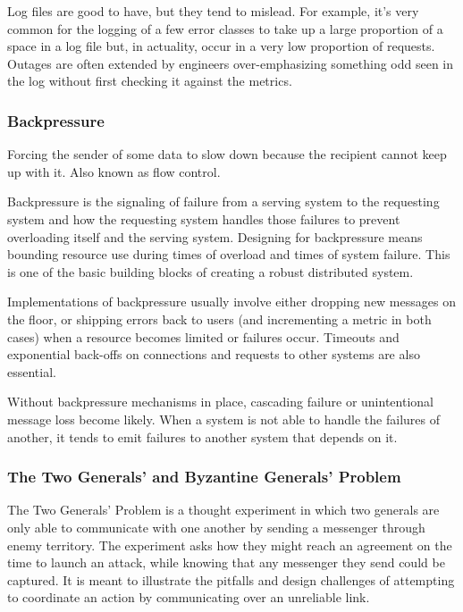 \documentclass{article}
\begin{document}
    Log files are good to have, but they tend to mislead. For example, it’s very common for the logging of a few error classes to take up a large proportion of a space in a log file but, in actuality, occur in a very low proportion of requests. Outages are often extended by engineers over-emphasizing something odd seen in the log without first checking it against the metrics.
    
    
    \subsubsection{Backpressure}
    Forcing the sender of some data to slow down because the recipient cannot keep up with it. Also known as flow control.
    
    Backpressure is the signaling of failure from a serving system to the requesting system and how the requesting system handles those failures to prevent overloading itself and the serving system. Designing for backpressure means bounding resource use during times of overload and times of system failure. This is one of the basic building blocks of creating a robust distributed system.
    
    Implementations of backpressure usually involve either dropping new messages on the floor, or shipping errors back to users (and incrementing a metric in both cases) when a resource becomes limited or failures occur. Timeouts and exponential back-offs on connections and requests to other systems are also essential.

    Without backpressure mechanisms in place, cascading failure or unintentional message loss become likely. When a system is not able to handle the failures of another, it tends to emit failures to another system that depends on it.
    
    \subsubsection{The Two Generals' and Byzantine Generals' Problem}
    The Two Generals' Problem is a thought experiment in which two generals are only able to communicate with one another by sending a messenger through enemy territory. The experiment asks how they might reach an agreement on the time to launch an attack, while knowing that any messenger they send could be captured. It is meant to illustrate the pitfalls and design challenges of attempting to coordinate an action by communicating over an unreliable link.
    
\end{document}
